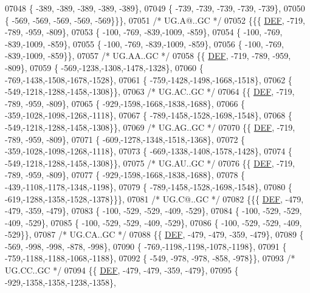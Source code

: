 \begin{DoxyCode}
07048 \{ -389, -389, -389, -389, -389\},
07049 \{ -739, -739, -739, -739, -739\},
07050 \{ -569, -569, -569, -569, -569\}\}\},
07051 \textcolor{comment}{/* UG.A@..GC */}
07052 \{\{\{  \mbox{\hyperlink{1_88_84__epars_8h_a397419fc12b37ed479c8abb9d444d843}{DEF}}, -719, -789, -959, -809\},
07053 \{ -100, -769, -839,-1009, -859\},
07054 \{ -100, -769, -839,-1009, -859\},
07055 \{ -100, -769, -839,-1009, -859\},
07056 \{ -100, -769, -839,-1009, -859\}\},
07057 \textcolor{comment}{/* UG.AA..GC */}
07058 \{\{  \mbox{\hyperlink{1_88_84__epars_8h_a397419fc12b37ed479c8abb9d444d843}{DEF}}, -719, -789, -959, -809\},
07059 \{ -569,-1238,-1308,-1478,-1328\},
07060 \{ -769,-1438,-1508,-1678,-1528\},
07061 \{ -759,-1428,-1498,-1668,-1518\},
07062 \{ -549,-1218,-1288,-1458,-1308\}\},
07063 \textcolor{comment}{/* UG.AC..GC */}
07064 \{\{  \mbox{\hyperlink{1_88_84__epars_8h_a397419fc12b37ed479c8abb9d444d843}{DEF}}, -719, -789, -959, -809\},
07065 \{ -929,-1598,-1668,-1838,-1688\},
07066 \{ -359,-1028,-1098,-1268,-1118\},
07067 \{ -789,-1458,-1528,-1698,-1548\},
07068 \{ -549,-1218,-1288,-1458,-1308\}\},
07069 \textcolor{comment}{/* UG.AG..GC */}
07070 \{\{  \mbox{\hyperlink{1_88_84__epars_8h_a397419fc12b37ed479c8abb9d444d843}{DEF}}, -719, -789, -959, -809\},
07071 \{ -609,-1278,-1348,-1518,-1368\},
07072 \{ -359,-1028,-1098,-1268,-1118\},
07073 \{ -669,-1338,-1408,-1578,-1428\},
07074 \{ -549,-1218,-1288,-1458,-1308\}\},
07075 \textcolor{comment}{/* UG.AU..GC */}
07076 \{\{  \mbox{\hyperlink{1_88_84__epars_8h_a397419fc12b37ed479c8abb9d444d843}{DEF}}, -719, -789, -959, -809\},
07077 \{ -929,-1598,-1668,-1838,-1688\},
07078 \{ -439,-1108,-1178,-1348,-1198\},
07079 \{ -789,-1458,-1528,-1698,-1548\},
07080 \{ -619,-1288,-1358,-1528,-1378\}\}\},
07081 \textcolor{comment}{/* UG.C@..GC */}
07082 \{\{\{  \mbox{\hyperlink{1_88_84__epars_8h_a397419fc12b37ed479c8abb9d444d843}{DEF}}, -479, -479, -359, -479\},
07083 \{ -100, -529, -529, -409, -529\},
07084 \{ -100, -529, -529, -409, -529\},
07085 \{ -100, -529, -529, -409, -529\},
07086 \{ -100, -529, -529, -409, -529\}\},
07087 \textcolor{comment}{/* UG.CA..GC */}
07088 \{\{  \mbox{\hyperlink{1_88_84__epars_8h_a397419fc12b37ed479c8abb9d444d843}{DEF}}, -479, -479, -359, -479\},
07089 \{ -569, -998, -998, -878, -998\},
07090 \{ -769,-1198,-1198,-1078,-1198\},
07091 \{ -759,-1188,-1188,-1068,-1188\},
07092 \{ -549, -978, -978, -858, -978\}\},
07093 \textcolor{comment}{/* UG.CC..GC */}
07094 \{\{  \mbox{\hyperlink{1_88_84__epars_8h_a397419fc12b37ed479c8abb9d444d843}{DEF}}, -479, -479, -359, -479\},
07095 \{ -929,-1358,-1358,-1238,-1358\},

\end{DoxyCode}
